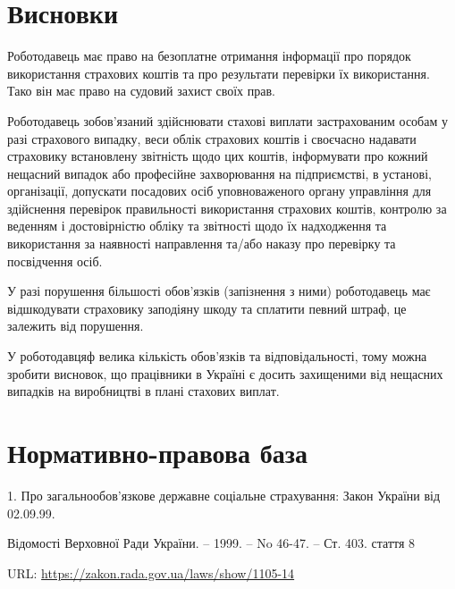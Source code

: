 \section*{Висновки}

Роботодавець має право на безоплатне отримання інформації про порядок використання страхових коштів та про результати перевірки їх використання. Тако він має право на судовий захист своїх прав.


Роботодавець зобов'язаний здійснювати стахові виплати застрахованим особам у разі страхового випадку, веси облік страхових коштів і своєчасно надавати страховику встановлену звітність щодо цих коштів, інформувати про кожний нещасний випадок або професійне захворювання на підприємстві, в установі, організації, допускати посадових осіб уповноваженого органу управління для здійснення перевірок правильності використання страхових коштів, контролю за веденням і достовірністю обліку та звітності щодо їх надходження та використання за наявності направлення та/або наказу про перевірку та посвідчення осіб.


У разі порушення більшості обов'язків (запізнення з ними) роботодавець має відшкодувати страховику заподіяну шкоду та сплатити певний штраф, це залежить від порушення.

У роботодавцяф велика кількість обов'язків та відповідальності, тому можна зробити висновок, що працівники в Україні є досить захищеними від нещасних випадків на виробництві в плані стахових виплат.

\section*{Нормативно-правова база}

1. Про загальнообов’язкове державне соціальне страхування: Закон України від 02.09.99.


Відомості Верховної Ради України. – 1999. – No
46-47. – Ст. 403. стаття 8


URL: \url{https://zakon.rada.gov.ua/laws/show/1105-14}